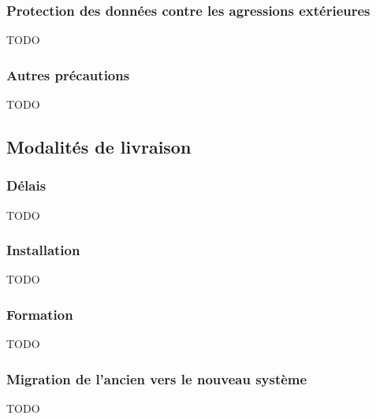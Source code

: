     \subsubsection{Protection des données contre les agressions extérieures}
        \begin{center} \begin{Large}TODO\end{Large}  \end{center}
    \subsubsection{Autres précautions}
        \begin{center} \begin{Large}TODO\end{Large}  \end{center}
  \subsection{Modalités de livraison}
    \subsubsection{Délais}
    \begin{center} \begin{Large}TODO\end{Large}  \end{center}
    \subsubsection{Installation}
    \begin{center} \begin{Large}TODO\end{Large}  \end{center}
    \subsubsection{Formation}
    \begin{center} \begin{Large}TODO\end{Large}  \end{center}
    \subsubsection{Migration de l’ancien vers le nouveau système}
    \begin{center} \begin{Large}TODO\end{Large}  \end{center}

